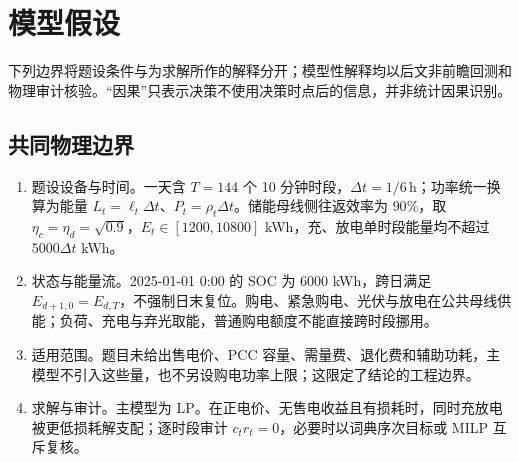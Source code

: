 \section{模型假设}\label{sec:assumptions}

下列边界将题设条件与为求解所作的解释分开；模型性解释均以后文非前瞻回测和物理审计核验。“因果”只表示决策不使用决策时点后的信息，并非统计因果识别。

\subsection{共同物理边界}\label{sec:assumptions-common}
\begin{enumerate}[label=A\arabic*:,leftmargin=3.0em,labelsep=0.4em,itemsep=0.22em]
\item 题设设备与时间。一天含 $T=144$ 个 10 分钟时段，$\Delta t=1/6\,\mathrm{h}$；功率统一换算为能量 $L_t=\ell_t\Delta t$、$P_t=\rho_t\Delta t$。储能母线侧往返效率为 $90\%$，取 $\eta_c=\eta_d=\sqrt{0.9}$，$E_t\in[1200,10800]$ kWh，充、放电单时段能量均不超过 $5000\Delta t$ kWh。
\item 状态与能量流。2025-01-01 0:00 的 SOC 为 6000 kWh，跨日满足 $E_{d+1,0}=E_{d,T}$，不强制日末复位。购电、紧急购电、光伏与放电在公共母线供能；负荷、充电与弃光取能，普通购电额度不能直接跨时段挪用。
\item 适用范围。题目未给出售电价、PCC 容量、需量费、退化费和辅助功耗，主模型不引入这些量，也不另设购电功率上限；这限定了结论的工程边界。
\item 求解与审计。主模型为 LP。在正电价、无售电收益且有损耗时，同时充放电被更低损耗解支配；逐时段审计 $c_tr_t=0$，必要时以词典序次目标或 MILP 互斥复核。
\end{enumerate}

